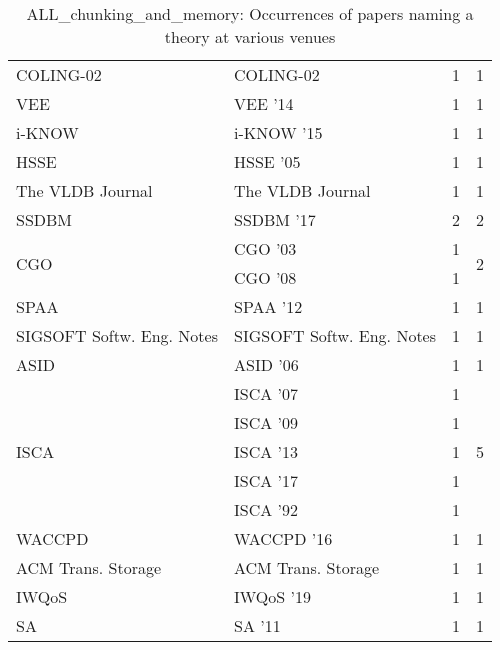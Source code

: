 \begin{table*}[t]
\begin{tabular}{llrr}
\multirow{1}{*}{COLING-02} & COLING-02 & 1 & \multirow{1}{*}{1}\\
\multirow{1}{*}{VEE } & VEE '14 & 1 & \multirow{1}{*}{1}\\
\multirow{1}{*}{i-KNOW } & i-KNOW '15 & 1 & \multirow{1}{*}{1}\\
\multirow{1}{*}{HSSE } & HSSE '05 & 1 & \multirow{1}{*}{1}\\
\multirow{1}{*}{The VLDB Journal} & The VLDB Journal & 1 & \multirow{1}{*}{1}\\
\multirow{1}{*}{SSDBM } & SSDBM '17 & 2 & \multirow{1}{*}{2}\\
\multirow{2}{*}{CGO } & CGO '03 & 1 & \multirow{2}{*}{2}\\
& CGO '08 & 1 &\\
\multirow{1}{*}{SPAA } & SPAA '12 & 1 & \multirow{1}{*}{1}\\
\multirow{1}{*}{SIGSOFT Softw. Eng. Notes} & SIGSOFT Softw. Eng. Notes & 1 & \multirow{1}{*}{1}\\
\multirow{1}{*}{ASID } & ASID '06 & 1 & \multirow{1}{*}{1}\\
\multirow{5}{*}{ISCA } & ISCA '07 & 1 & \multirow{5}{*}{5}\\
& ISCA '09 & 1 &\\
& ISCA '13 & 1 &\\
& ISCA '17 & 1 &\\
& ISCA '92 & 1 &\\
\multirow{1}{*}{WACCPD } & WACCPD '16 & 1 & \multirow{1}{*}{1}\\
\multirow{1}{*}{ACM Trans. Storage} & ACM Trans. Storage & 1 & \multirow{1}{*}{1}\\
\multirow{1}{*}{IWQoS } & IWQoS '19 & 1 & \multirow{1}{*}{1}\\
\multirow{1}{*}{SA } & SA '11 & 1 & \multirow{1}{*}{1}\\
\end{tabular}
\caption{ALL\_chunking\_and\_memory: Occurrences of papers naming a theory at various venues}
\end{table*}
